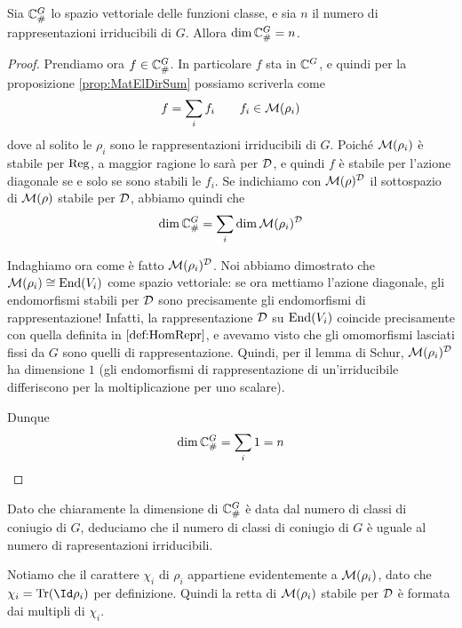 		\begin{myprop}
			Sia $\mathbb C^{G}_\#$ lo spazio vettoriale delle funzioni classe, e sia $n$ il numero di rappresentazioni irriducibili di $G$. Allora $\dim \mathbb C^{G}_\# = n$.
		\end{myprop}
		\begin{proof}
			
			Prendiamo ora $f\in \mathbb C^{G}_\#$. In particolare $f$ sta in $\mathbb C^{G}$, e quindi per la proposizione \ref{prop:MatElDirSum} possiamo scriverla come
			\[
			f= \sum_i f_i\qquad f_i \in \mathcal M(\rho_i)
			\]
			dove al solito le $\rho_i$ sono le rappresentazioni irriducibili di $G$. Poiché $\mathcal M(\rho_i)$ è stabile per $\operatorname{Reg}$, a maggior ragione lo sarà per $\mathcal D$, e quindi $f$ è stabile per l'azione diagonale se e solo se sono stabili le $f_i$. Se indichiamo con $\mathcal M(\rho)^\mathcal D$ il sottospazio di $\mathcal M(\rho)$ stabile per $\mathcal D$, abbiamo quindi che
			\[
				\dim \mathbb C^{G}_\# = \sum_i \dim \mathcal M(\rho_i)^\mathcal D
			\]
			
			Indaghiamo ora come è fatto $\mathcal M(\rho_i)^\mathcal D$. Noi abbiamo dimostrato che $\mathcal M(\rho_i)\cong \operatorname{End}(V_i)$ come spazio vettoriale: se ora mettiamo l'azione diagonale, gli endomorfismi stabili per $\mathcal D$ sono precisamente gli endomorfismi di rappresentazione! Infatti, la rappresentazione $\mathcal D$ su $\operatorname{End}(V_i)$ coincide precisamente con quella definita in $\ref{def:HomRepr}$, e avevamo visto che gli omomorfismi lasciati fissi da $G$ sono quelli di rappresentazione. Quindi, per il lemma di Schur, $\mathcal M(\rho_i)^\mathcal D$ ha dimensione $1$ (gli endomorfismi di rappresentazione di un'irriducibile differiscono per la moltiplicazione per uno scalare).
			
			Dunque
			\[
				\dim \mathbb C^{G}_\# = \sum_i 1 = n
			\]

		\end{proof}
		
		Dato che chiaramente la dimensione di $\mathbb C^{G}_\#$ è data dal numero di classi di coniugio di $G$, deduciamo che il numero di classi di coniugio di $G$ è uguale al numero di rapresentazioni irriducibili.
		
		\begin{myobs}
			Notiamo che il carattere $\chi_i$ di $\rho_i$ appartiene evidentemente a $\mathcal M(\rho_i)$, dato che $\chi_i = \Tr(\Id\rho_i)$ per definizione. Quindi la retta di $\mathcal M(\rho_i)$ stabile per $\mathcal D$ è formata dai multipli di $\chi_i$.
		\end{myobs}


		
		



	
	



